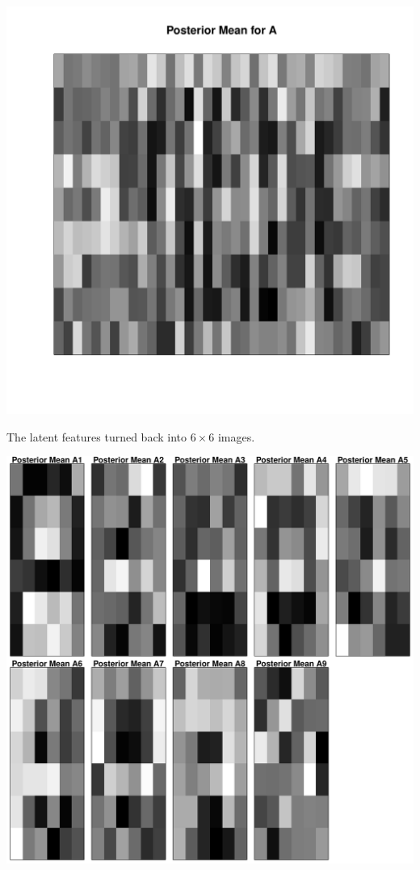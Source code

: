 \beginmyfig
  \caption{}
  \includegraphics{images/postA.pdf}
  \vspace{-15mm}
\endmyfig
\beginmyfig
  \caption{The latent features turned back into $6 \times 6$ images.}
  \includegraphics{images/postA66.pdf}
\endmyfig

